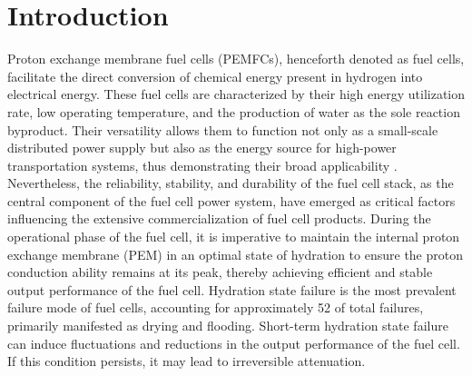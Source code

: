 \section{Introduction}
Proton exchange membrane fuel cells (PEMFCs), henceforth denoted as fuel cells, facilitate the direct conversion of chemical energy present in hydrogen into electrical energy.
These fuel cells are characterized by their high energy utilization rate, low operating temperature, and the production of water as the sole reaction byproduct.
Their versatility allows them to function not only as a small-scale distributed power supply but also as the energy source for high-power transportation systems, thus demonstrating their broad applicability \cite{sharafOverviewFuelCell2014} .
Nevertheless, the reliability, stability, and durability of the fuel cell stack, as the central component of the fuel cell power system, have emerged as critical factors influencing the extensive commercialization of fuel cell products.
During the operational phase of the fuel cell, it is imperative to maintain the internal proton exchange membrane (PEM) in an optimal state of hydration to ensure the proton conduction ability remains at its peak, thereby achieving efficient and stable output performance of the fuel cell. Hydration state failure is the most prevalent failure mode of fuel cells, accounting for approximately 52 of total failures, primarily manifested as drying and flooding. Short-term hydration state failure can induce fluctuations and reductions in the output performance of the fuel cell. If this condition persists, it may lead to irreversible attenuation.
